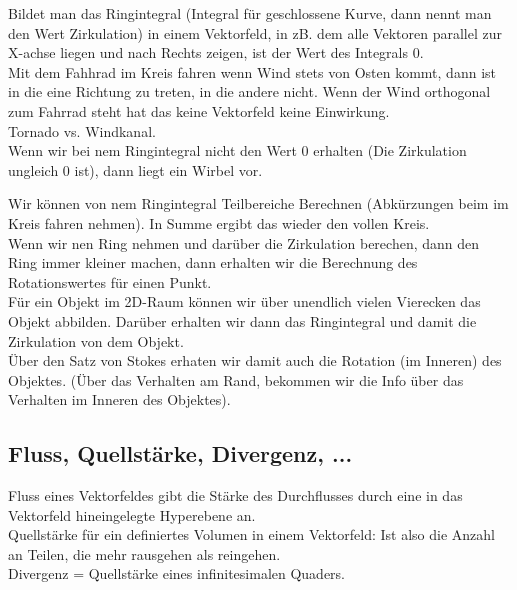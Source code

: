 \documentclass{article}
\begin{document}
\noindent Bildet man das Ringintegral (Integral für geschlossene Kurve, dann nennt man den Wert Zirkulation) in einem Vektorfeld, in zB. dem alle Vektoren parallel zur X-achse liegen und nach Rechts zeigen, ist der Wert des Integrals 0.\\
Mit dem Fahhrad im Kreis fahren wenn Wind stets von Osten kommt, dann ist in die eine Richtung zu treten, in die andere nicht. Wenn der Wind orthogonal zum Fahrrad steht hat das keine Vektorfeld keine Einwirkung.\\

Tornado vs. Windkanal.\\

\noindent Wenn wir bei nem Ringintegral nicht den Wert 0 erhalten (Die Zirkulation ungleich 0 ist), dann liegt ein Wirbel vor.


\noindent  Wir können von nem Ringintegral Teilbereiche Berechnen (Abkürzungen beim im Kreis fahren nehmen). In Summe ergibt das wieder den vollen Kreis.\\
 
\noindent  Wenn wir nen Ring nehmen und darüber die Zirkulation berechen, dann den Ring immer kleiner machen, dann erhalten wir die Berechnung des Rotationswertes für einen Punkt.\\
 
\noindent  Für ein Objekt im 2D-Raum können wir über unendlich vielen Vierecken das Objekt abbilden. Darüber erhalten wir dann das Ringintegral und damit die Zirkulation von dem Objekt.\\
 Über den Satz von Stokes erhaten wir damit auch die Rotation (im Inneren) des Objektes. (Über das Verhalten am Rand, bekommen wir die Info über das Verhalten im Inneren des Objektes).\\


\subsection{Fluss, Quellstärke, Divergenz, ...}

Fluss eines Vektorfeldes gibt die Stärke des Durchflusses durch eine in das Vektorfeld hineingelegte Hyperebene an.\\

\noindent Quellstärke für ein definiertes Volumen in einem Vektorfeld: Ist also die Anzahl an Teilen, die mehr rausgehen als reingehen.\\

\noindent Divergenz	= Quellstärke eines infinitesimalen Quaders.\\
\end{document}

